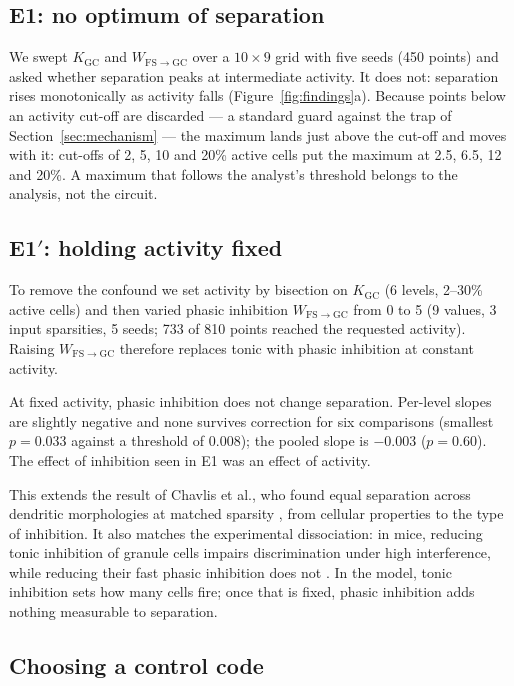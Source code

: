 \documentclass[11pt,a4paper]{article}
\newcommand{\Kgc}{K_{\mathrm{GC}}}
\newcommand{\Wfsgc}{W_{\mathrm{FS}\to\mathrm{GC}}}
\begin{document}
\subsection{E1: no optimum of separation}

We swept $\Kgc$ and $\Wfsgc$ over a $10\times9$ grid with five seeds (450 points)
and asked whether separation peaks at intermediate activity. It does not:
separation rises monotonically as activity falls (Figure~\ref{fig:findings}a).
Because points below an activity cut-off are discarded --- a standard guard
against the trap of Section~\ref{sec:mechanism} --- the maximum lands just above
the cut-off and moves with it: cut-offs of 2, 5, 10 and 20\% active cells put the
maximum at 2.5, 6.5, 12 and 20\%. A maximum that follows the analyst's threshold
belongs to the analysis, not the circuit.

\subsection{E1$'$: holding activity fixed}
\label{sec:matched}

To remove the confound we set activity by bisection on $\Kgc$ (6 levels, 2--30\%
active cells) and then varied phasic inhibition $\Wfsgc$ from 0 to 5 (9 values,
3 input sparsities, 5 seeds; 733 of 810 points reached the requested activity).
Raising $\Wfsgc$ therefore replaces tonic with phasic inhibition at constant
activity.

At fixed activity, phasic inhibition does not change separation. Per-level slopes
are slightly negative and none survives correction for six comparisons (smallest
$p=0.033$ against a threshold of $0.008$); the pooled slope is $-0.003$
($p=0.60$). The effect of inhibition seen in E1 was an effect of activity.

This extends the result of Chavlis et al., who found equal separation across
dendritic morphologies at matched sparsity \cite{chavlis2017}, from cellular
properties to the type of inhibition. It also matches the experimental
dissociation: in mice, reducing tonic inhibition of granule cells impairs
discrimination under high interference, while reducing their fast phasic
inhibition does not \cite{engin2015}. In the model, tonic inhibition sets how
many cells fire; once that is fixed, phasic inhibition adds nothing measurable
to separation.

\subsection{Choosing a control code}
\label{sec:nulls}
\end{document}

